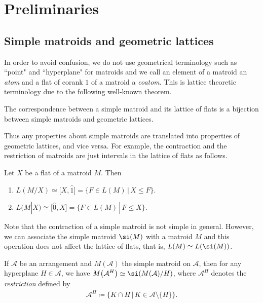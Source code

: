 \section{Preliminaries}\label{sec: preliminaries}

\subsection{Simple matroids and geometric lattices}

In order to avoid confusion, we do not use geometrical terminology such as ``point" and ``hyperplane" for matroids and we call an element of a matroid an \textit{atom} and a flat of corank $ 1 $ of a matroid a \textit{coatom}.
This is lattice theoretic terminology due to the following well-known theorem.

\begin{Theorem}\label{simple matroid geometric lattice correspondence}
The correspondence between a simple matroid and its lattice of flats is a bijection between simple matroids and geometric lattices.
\end{Theorem}

Thus any properties about simple matroids are translated into properties of geometric lattices, and vice versa.
For example, the contraction and the restriction of matroids are just intervals in the lattice of flats as follows.

\begin{Proposition}\label{Oxley interval}
Let $ X $ be a flat of a matroid $ M $. Then
\begin{enumerate}[$(1)$]\itemsep=0pt
\item\label{Oxley interval 1} $ L(M/X) \simeq \big[X, \hat{1}\big] = \{ F \in L(M) \,|\, X \leq F \} $.
\item\label{Oxley interval 2} $ L(M|X) \simeq \big[\hat{0}, X\big] = \{ F \in L(M) \,|\, F \leq X \} $.
\end{enumerate}
\end{Proposition}

Note that the contraction of a simple matroid is not simple in general.
However, we can associate the simple matroid $ \si(M) $ with a matroid $ M $ and this operation does not affect the lattice of flats, that is, $ L(M) \simeq L(\si(M)) $.

If $ \mathcal{A} $ be an arrangement and $ M(\mathcal{A}) $ the simple matroid on $ \mathcal{A} $, then for any hyperplane $ H \in \mathcal{A} $, we have $ M\big(\mathcal{A}^{H}\big) \simeq \si(M(\mathcal{A})/H) $, where $ \mathcal{A}^{H} $ denotes the \textit{restriction} defined by
\begin{gather*}
\mathcal{A}^{H} \coloneqq \{ K \cap H \,|\, K \in \mathcal{A}\setminus\{H\}\}.
\end{gather*}


